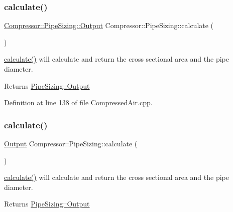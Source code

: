\subsubsection{\texorpdfstring{calculate()}{calculate()}\hspace{0.1cm}{\footnotesize\ttfamily [1/3]}}
{\footnotesize\ttfamily \hyperlink{struct_compressor_1_1_pipe_sizing_1_1_output}{Compressor\+::\+Pipe\+Sizing\+::\+Output} Compressor\+::\+Pipe\+Sizing\+::calculate (\begin{DoxyParamCaption}{ }\end{DoxyParamCaption})}

\hyperlink{class_compressor_1_1_pipe_sizing_a9212c8d52ff658c412752cee18d6b28d}{calculate()} will calculate and return the cross sectional area and the pipe diameter. \begin{DoxyReturn}{Returns}
\hyperlink{struct_compressor_1_1_pipe_sizing_1_1_output}{Pipe\+Sizing\+::\+Output} 
\end{DoxyReturn}


Definition at line 138 of file Compressed\+Air.\+cpp.

\mbox{\label{class_compressor_1_1_pipe_sizing_a0b4a10531fb9a8c3bb9aae0441ed5182}} 
\subsubsection{\texorpdfstring{calculate()}{calculate()}\hspace{0.1cm}{\footnotesize\ttfamily [2/3]}}
{\footnotesize\ttfamily \hyperlink{struct_compressor_1_1_pipe_sizing_1_1_output}{Output} Compressor\+::\+Pipe\+Sizing\+::calculate (\begin{DoxyParamCaption}{ }\end{DoxyParamCaption})}

\hyperlink{class_compressor_1_1_pipe_sizing_a9212c8d52ff658c412752cee18d6b28d}{calculate()} will calculate and return the cross sectional area and the pipe diameter. \begin{DoxyReturn}{Returns}
\hyperlink{struct_compressor_1_1_pipe_sizing_1_1_output}{Pipe\+Sizing\+::\+Output} 
\end{DoxyReturn}
\mbox{\label{class_compressor_1_1_pipe_sizing_a0b4a10531fb9a8c3bb9aae0441ed5182}} 
